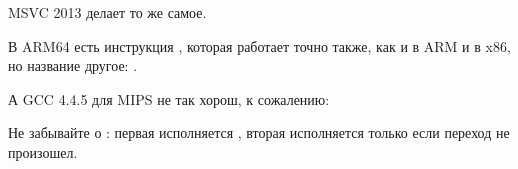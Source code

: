 

MSVC 2013 делает то же самое.

В ARM64 есть инструкция , которая работает точно также, как и  в ARM и  в x86,
но название другое: .




А GCC 4.4.5 для MIPS не так хорош, к сожалению:



Не забывайте о : первая  исполняется  ,
вторая  исполняется только если переход не произошел.

